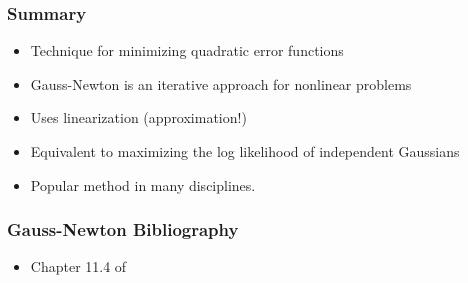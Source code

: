 \begin{frame}
    \frametitle{Summary}
    
    \begin{itemize}
        \item Technique for minimizing quadratic error functions
        \item Gauss-Newton is an iterative approach for nonlinear problems
        \item Uses linearization (approximation!)
        \item Equivalent to maximizing the log likelihood of independent Gaussians
        \item Popular method in many disciplines.
    \end{itemize}

    
\end{frame}

\begin{frame}
    \frametitle{Gauss-Newton Bibliography}
    \begin{itemize}
        \item Chapter 11.4 of \cite{thrun2005probabilistic}
    \end{itemize}
\end{frame}
